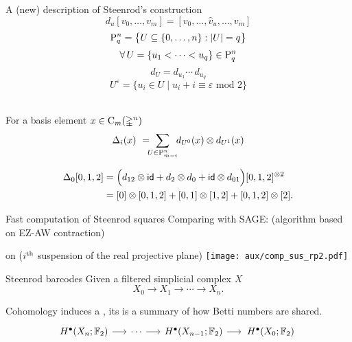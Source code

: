 \begin{frame}[fragile]{A (new) description of Steenrod's construction}
	\pause\vskip-5pt
	\vspace*{-5pt}
	\[
	d_u[v_0, \dots, v_m] = [v_0, \dots, \widehat v_u, \dots, v_m]
	\]
	\pause\vspace*{-15pt}
	\[
	\rP_q^n = \set[\big]{U \subseteq \{0, \dots, n\} : \bars{U} = q}
	\]
	\pause\vspace*{-15pt}
	\[
	\forall \, U = \{u_1 < \dots < u_q\} \in \rP_q^n
	\]
	\pause\vspace*{-15pt}
	\[
	d_U = d_{u_1} \dotsm \, d_{u_q}
	\]
	\pause\vspace*{-15pt}
	\[
	U^\varepsilon = \big\{ u_i \in U \mid u_i + i \equiv \varepsilon \text{ mod } 2 \big\}
	\]

	\bigskip\pause
	 \\
	For a basis element $x \in \gchains_m(\gsimplex^n)$
	\vspace*{-5pt}
	\[
	\Delta_i(x) \ = \!\!\! \sum_{U \in \rP_{m-i}^n} \!\! d_{U^0}(x) \otimes d_{U^1}(x)
	\]
	\vspace*{-10pt}

	\pause
	\vspace*{-5pt}
	\begin{align*}
	\Delta_0 [0,1,2] &=
	\Big( d_{12} \otimes \id + d_2 \otimes d_0 + \id \otimes d_{01} \Big) [0,1,2]^{\otimes 2} \\ &=
	[0] \otimes [0,1,2] + [0,1] \otimes [1,2] + [0,1,2] \otimes [2].
	\end{align*}
\end{frame}

\begin{frame}{Fast computation of Steenrod squares}
	\pause
	Comparing with SAGE: (algorithm based on EZ-AW contraction)

	\smallskip\pause
	 on  ($i^\th$ suspension of the real projective plane)
	\medskip
	\texttt{[image: aux/comp\_sus\_rp2.pdf]}
\end{frame}

\begin{frame}[fragile]{Steenrod barcodes}
	\pause
	Given a filtered simplicial complex $X$
	\[
	X_0 \to X_1 \to \cdots \to X_n.
	\]

	\pause
	Cohomology induces a , its  is a summary of how Betti numbers are shared.
	\phantom{$Sq^k$ induces an endomorphism}
	\[
	\begin{tikzcd}[column sep = 15]
		H^\bullet(X_n; \Ftwo) \arrow[r] & \cdots \arrow[r] & H^\bullet(X_{n-1}; \Ftwo) \arrow[r] & \,H^\bullet(X_0; \Ftwo) \phantom{.}
	\end{tikzcd}
	\]
\end{frame}

